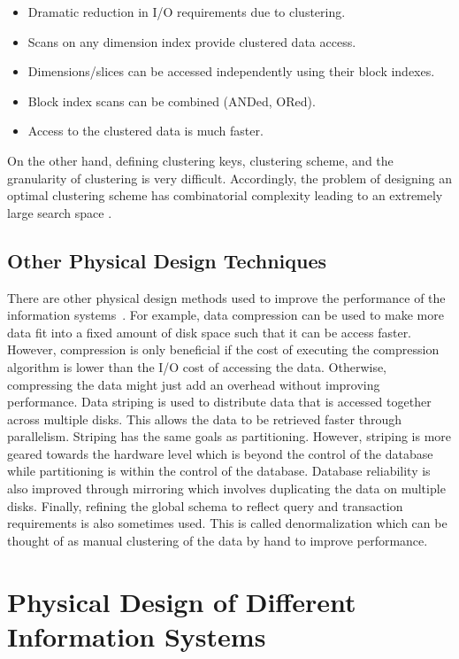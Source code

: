 \documentclass[12pt,a4paper]{article}
\begin{document}
\begin{itemize}
 \item Dramatic reduction in I/O requirements due to clustering.
 \item Scans on any dimension index provide clustered data access.
 \item Dimensions/slices can be accessed independently using their block indexes.
 \item Block index scans can be combined (ANDed, ORed).
 \item Access to the clustered data is much faster.
\end{itemize}

On the other hand, defining clustering keys, clustering scheme, and the granularity of clustering is very difficult. Accordingly, the problem of
designing an optimal clustering scheme has combinatorial complexity leading to an extremely large search space \cite{jagadish1999snakes}.

\subsection{Other Physical Design Techniques}

There are other physical design methods used to improve the performance of the information systems~\cite{lightstone2007physical}. For example, data compression
can
be used to make more data fit into a fixed amount of disk space such that it can be access faster. However, compression is only beneficial if the cost of
executing the compression algorithm is lower than the I/O cost of accessing the data. Otherwise, compressing the data might just add an overhead without
improving performance. Data striping is used to distribute data that is accessed together across multiple disks. This allows the data
to be retrieved faster through parallelism. Striping has the same goals as partitioning. However, striping is more geared towards the hardware level
which is beyond the control of the database while partitioning is within the control of the database. Database reliability is also improved through mirroring
which involves duplicating the data on multiple disks. Finally, refining the global schema to reflect query and transaction requirements is also sometimes used.
This is called denormalization which can be thought of as manual clustering of the data by hand to improve performance.

\section{Physical Design of Different Information Systems}
\label{SEC-DIFFSYS}
\end{document}
